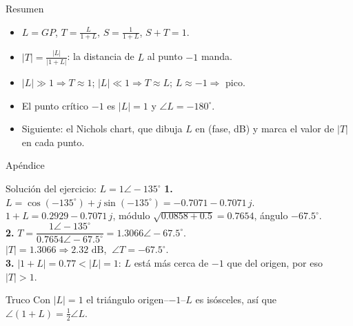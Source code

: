 \documentclass[aspectratio=169,11pt]{beamer}
\begin{document}
\begin{frame}{Resumen}
  \small
  \begin{itemize}
    \item $L=GP$, $T=\frac{L}{1+L}$, $S=\frac{1}{1+L}$, $S+T=1$.
    \item $|T|=\frac{|L|}{|1+L|}$: la distancia de $L$ al punto $-1$ manda.
    \item $|L|\gg1\Rightarrow T\approx1$; $|L|\ll1\Rightarrow T\approx L$; $L\approx-1\Rightarrow$ pico.
    \item El punto crítico $-1$ es $|L|=1$ y $\angle L=-180^\circ$.
    \item Siguiente: el Nichols chart, que dibuja $L$ en (fase, dB) y marca el valor de $|T|$ en cada punto.
  \end{itemize}
\end{frame}

\appendix
\begin{frame}\centering\Large Apéndice\end{frame}

\begin{frame}{Solución del ejercicio: $L=1\angle-135^\circ$}
  \small
  \textbf{1.} $L=\cos(-135^\circ)+j\sin(-135^\circ)=-0.7071-0.7071\,j$.\\
  $1+L=0.2929-0.7071\,j$, módulo $\sqrt{0.0858+0.5}=0.7654$, ángulo $-67.5^\circ$.\\[4pt]
  \textbf{2.} $T=\dfrac{1\angle-135^\circ}{0.7654\angle-67.5^\circ}=1.3066\angle-67.5^\circ$.\\
  $|T|=1.3066\Rightarrow\boxed{2.32\text{ dB}}$, $\ \angle T=\boxed{-67.5^\circ}$.\\[4pt]
  \textbf{3.} $|1+L|=0.77<|L|=1$: $L$ está más cerca de $-1$ que del origen, por eso $|T|>1$.\\[6pt]
  \begin{block}{Truco}
    Con $|L|=1$ el triángulo origen--$-1$--$L$ es isósceles, así que $\angle(1+L)=\tfrac12\angle L$.
  \end{block}
\end{frame}
\end{document}
